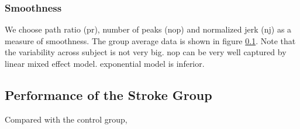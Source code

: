 \subsubsection{Smoothness}
We choose path ratio (pr), number of peaks (nop) and normalized jerk (nj) as a measure of smoothness. The group average data is shown in figure \ref{}. Note that the variability across subject is not very big. nop can be very well captured by linear mixed effect model. exponential model is inferior. 

\subsection{Performance of the Stroke Group}

Compared with the control group,






















































